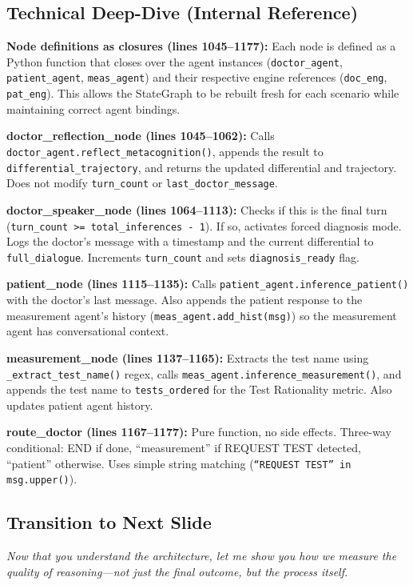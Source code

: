 \subsection*{Technical Deep-Dive (Internal Reference)}
{\color{techgray}
\textbf{Node definitions as closures (lines 1045--1177):} Each node is defined as a Python function that closes over the agent instances (\texttt{doctor\_agent}, \texttt{patient\_agent}, \texttt{meas\_agent}) and their respective engine references (\texttt{doc\_eng}, \texttt{pat\_eng}). This allows the StateGraph to be rebuilt fresh for each scenario while maintaining correct agent bindings.

\textbf{doctor\_reflection\_node (lines 1045--1062):} Calls \texttt{doctor\_agent.reflect\_metacognition()}, appends the result to \texttt{differential\_trajectory}, and returns the updated differential and trajectory. Does not modify \texttt{turn\_count} or \texttt{last\_doctor\_message}.

\textbf{doctor\_speaker\_node (lines 1064--1113):} Checks if this is the final turn (\texttt{turn\_count >= total\_inferences - 1}). If so, activates forced diagnosis mode. Logs the doctor's message with a timestamp and the current differential to \texttt{full\_dialogue}. Increments \texttt{turn\_count} and sets \texttt{diagnosis\_ready} flag.

\textbf{patient\_node (lines 1115--1135):} Calls \texttt{patient\_agent.inference\_patient()} with the doctor's last message. Also appends the patient response to the measurement agent's history (\texttt{meas\_agent.add\_hist(msg)}) so the measurement agent has conversational context.

\textbf{measurement\_node (lines 1137--1165):} Extracts the test name using \texttt{\_extract\_test\_name()} regex, calls \texttt{meas\_agent.inference\_measurement()}, and appends the test name to \texttt{tests\_ordered} for the Test Rationality metric. Also updates patient agent history.

\textbf{route\_doctor (lines 1167--1177):} Pure function, no side effects. Three-way conditional: END if done, ``measurement'' if REQUEST TEST detected, ``patient'' otherwise. Uses simple string matching (\texttt{``REQUEST TEST'' in msg.upper()}).
}

\subsection*{Transition to Next Slide}
{\color{transgreen}
\textit{Now that you understand the architecture, let me show you how we measure the quality of reasoning---not just the final outcome, but the process itself.}
}

